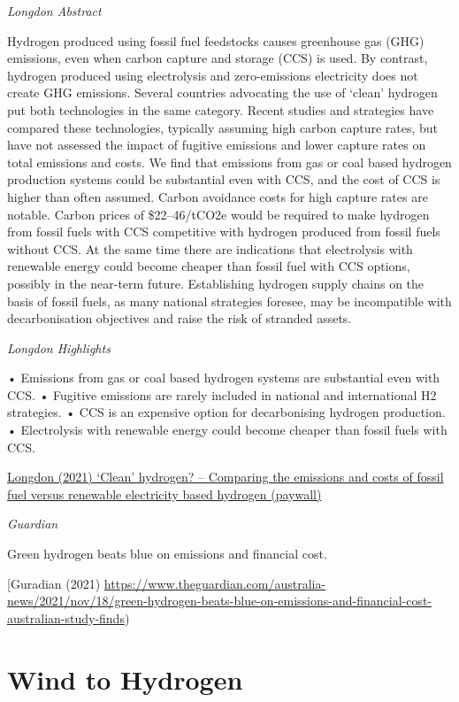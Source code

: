 \documentclass[
]{book}
\begin{document}
\emph{Longdon Abstract}

Hydrogen produced using fossil fuel feedstocks causes greenhouse gas (GHG) emissions, even when carbon capture and storage (CCS) is used. By contrast, hydrogen produced using electrolysis and zero-emissions electricity does not create GHG emissions. Several countries advocating the use of `clean' hydrogen put both technologies in the same category. Recent studies and strategies have compared these technologies, typically assuming high carbon capture rates, but have not assessed the impact of fugitive emissions and lower capture rates on total emissions and costs. We find that emissions from gas or coal based hydrogen production systems could be substantial even with CCS, and the cost of CCS is higher than often assumed. Carbon avoidance costs for high capture rates are notable. Carbon prices of \$22--46/tCO2e would be required to make hydrogen from fossil fuels with CCS competitive with hydrogen produced from fossil fuels without CCS. At the same time there are indications that electrolysis with renewable energy could become cheaper than fossil fuel with CCS options, possibly in the near-term future. Establishing hydrogen supply chains on the basis of fossil fuels, as many national strategies foresee, may be incompatible with decarbonisation objectives and raise the risk of stranded assets.

\emph{Longdon Highlights}

• Emissions from gas or coal based hydrogen systems are substantial even with CCS.
• Fugitive emissions are rarely included in national and international H2 strategies.
• CCS is an expensive option for decarbonising hydrogen production.
• Electrolysis with renewable energy could become cheaper than fossil fuels with CCS.

\href{https://www.sciencedirect.com/science/article/abs/pii/S0306261921014215}{Longdon (2021) `Clean' hydrogen? -- Comparing the emissions and costs of fossil fuel versus renewable electricity based hydrogen (paywall)}

\emph{Guardian}

Green hydrogen beats blue on emissions and financial cost.

{[}Guradian (2021) \url{https://www.theguardian.com/australia-news/2021/nov/18/green-hydrogen-beats-blue-on-emissions-and-financial-cost-australian-study-finds})

\hypertarget{wind-to-hydrogen}{%
\section{Wind to Hydrogen}\label{wind-to-hydrogen}}
\end{document}
